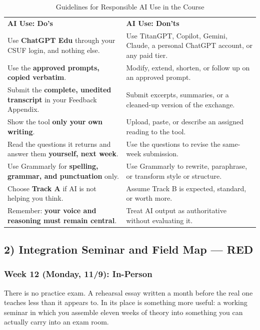 \documentclass[11pt]{article}     %
\begin{document}
\begin{center}
\begin{table}[h]
    \caption{Guidelines for Responsible AI Use in the Course}
    \label{tab:ai-guidelines}
    \centering
    \begin{tabularx}{\linewidth}{L L}
    \textbf{AI Use: Do's} & \textbf{AI Use: Don'ts} \\
Use \textbf{ChatGPT Edu} through your CSUF login, and nothing else. & Use TitanGPT, Copilot, Gemini, Claude, a personal ChatGPT account, or any paid tier. \\
Use the \textbf{approved prompts, copied verbatim}. & Modify, extend, shorten, or follow up on an approved prompt. \\
Submit the \textbf{complete, unedited transcript} in your Feedback Appendix. & Submit excerpts, summaries, or a cleaned-up version of the exchange. \\
Show the tool \textbf{only your own writing}. & Upload, paste, or describe an assigned reading to the tool. \\
Read the questions it returns and answer them \textbf{yourself, next week}. & Use the questions to revise the same-week submission. \\
Use Grammarly for \textbf{spelling, grammar, and punctuation} only. & Use Grammarly to rewrite, paraphrase, or transform style or structure. \\
Choose \textbf{Track A} if AI is not helping you think. & Assume Track B is expected, standard, or worth more. \\
Remember: \textbf{your voice and reasoning must remain central}. & Treat AI output as authoritative without evaluating it. \\
    \end{tabularx}
\end{table}
\end{center}

\subsection*{2) Integration Seminar and Field Map --- RED}

\subsubsection*{Week 12 (Monday, 11/9): In-Person}

There is no practice exam. A rehearsal essay written a month before the real one teaches less than it appears to. In its place is something more useful: a working seminar in which you assemble eleven weeks of theory into something you can actually carry into an exam room.
\end{document}
